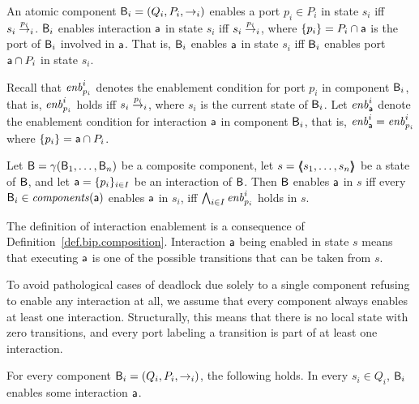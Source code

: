 \begin{definition}\label{def.bip.enablement} 
An atomic component $\B_i = (Q_i,P_i,\goesto_i)$ enables a port $p_i \in P_i$ in state $s_i$ iff $s_i \goesto[p_i]_i$.
$\B_i$ enables interaction $\act$ in state $s_i$ iff $s_i \goesto[p_i]_i$, where $\set{p_i} = P_i \ints \act$ is the port of $\B_i$ involved in $\act$.
That is, $\B_i$ enables $\act$ in state $s_i$ iff $\B_i$ enables port $\act \ints P_i$ in state $s_i$. 

Recall that $\gd{p_i}{i}$ denotes the enablement condition for port $p_i$ in component $\B_i$, that is, $\gd{p_i}{i}$ holds iff
$s_i \goesto[p_i]_i$, where $s_i$ is the current state of $\B_i$.
Let $\gd{\act}{i}$ denote the enablement condition for interaction $\act$ in
component $\B_i$, that is,  $\gd{\act}{i} = \gd{p_i}{i}$ where $\set{p_i} = \act \ints P_i$.  

Let $\B = \gamma(\B_1,\dots,\B_n)$ be a composite component, let
$s = \tpl{s_1,\ldots,s_n}$ be a state of $\B$,
and let $\act = \{p_i\}_{i\in I}$ be an interaction of $\B$.
Then $\B$ enables $\act$ in $s$
iff every $\B_i \in \cmps{\act}$ enables $\act$ in $s_i$, \ie iff
$\AND_{i \in I} \gd{p_i}{i}$ holds in $s$.
\end{definition}
%
The definition of  interaction enablement is a consequence of 
Definition~\ref{def.bip.composition}. 
Interaction $\act$ being enabled in state $s$ means that executing
$\act$ is one of the possible transitions that can be taken from $s$.

To avoid pathological cases of deadlock due solely to a single component refusing to enable any interaction at all, 
we assume that every component always enables at least one interaction.
Structurally, this means that there is no local state with zero transitions, 
and every port labeling a transition is 
part of at least one interaction. 

\begin{definition} \label{def.bip.local-enablement}
For every component  $\B_i = (Q_i,P_i,\goesto_i)$, the following holds. 
  In every $s_i \in Q_i$, $\B_i$ enables some
interaction $\act$.
\end{definition}

